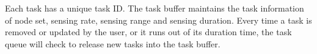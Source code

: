 \begin{table}[htbp]
	\caption{Task Buffer}
	\label{TB}
	\centering
\end{table}

Each task has a unique task ID. The task buffer maintains the task information of node set, 
sensing rate, sensing range and sensing duration. 
Every time a task is removed or updated by the user, or it runs out of its duration time,
the task queue will check to release new tasks into the task buffer.




